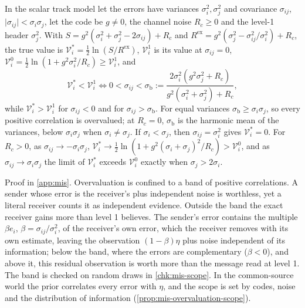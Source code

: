 \begin{proposition}\label{prop:mis-track-band}
In the scalar track model let the errors have variances $\sigma_i^2,\sigma_j^2$ and covariance $\sigma_{ij}$, $\lvert\sigma_{ij}\rvert<\sigma_i\sigma_j$, let the code be $g\neq0$, the channel noise $R_c\ge0$ and the level-1 header $\sigma_j^2$. With $S=g^2(\sigma_i^2+\sigma_j^2-2\sigma_{ij})+R_c$ and $R^{\mathrm{ex}}=g^2(\sigma_j^2-\sigma_{ij}^2/\sigma_i^2)+R_c$, the true value is $\mathcal V^\ast_i=\tfrac12\ln(S/R^{\mathrm{ex}})$, $\mathcal V^1_i$ is its value at $\sigma_{ij}=0$, $\mathcal V^0_i=\tfrac12\ln(1+g^2\sigma_i^2/R_c)\ge\mathcal V^1_i$, and
\begin{equation}\label{eq:mis-band}
\mathcal V^\ast_i<\mathcal V^1_i\iff0<\sigma_{ij}<\sigma_{\mathrm b}:=\frac{2\sigma_i^2(g^2\sigma_j^2+R_c)}{g^2(\sigma_i^2+\sigma_j^2)+R_c},
\end{equation}
while $\mathcal V^\ast_i>\mathcal V^1_i$ for $\sigma_{ij}<0$ and for $\sigma_{ij}>\sigma_{\mathrm b}$. For equal variances $\sigma_{\mathrm b}\ge\sigma_i\sigma_j$, so every positive correlation is overvalued; at $R_c=0$, $\sigma_{\mathrm b}$ is the harmonic mean of the variances, below $\sigma_i\sigma_j$ when $\sigma_i\neq\sigma_j$. If $\sigma_i<\sigma_j$, then $\sigma_{ij}=\sigma_i^2$ gives $\mathcal V^\ast_i=0$. For $R_c>0$, as $\sigma_{ij}\to-\sigma_i\sigma_j$, $\mathcal V^\ast_i\to\tfrac12\ln(1+g^2(\sigma_i+\sigma_j)^2/R_c)>\mathcal V^0_i$, and as $\sigma_{ij}\to\sigma_i\sigma_j$ the limit of $\mathcal V^\ast_i$ exceeds $\mathcal V^0_i$ exactly when $\sigma_j>2\sigma_i$.
\end{proposition}

Proof in \cref{app:mis}. Overvaluation is confined to a band of positive correlations. A sender whose error is the receiver's plus independent noise is worthless, yet a literal receiver counts it as independent evidence. Outside the band the exact receiver gains more than level 1 believes. The sender's error contains the multiple $\beta e_i$, $\beta=\sigma_{ij}/\sigma_i^2$, of the receiver's own error, which the receiver removes with its own estimate, leaving the observation $(1-\beta)\eta$ plus noise independent of its information; below the band, where the errors are complementary ($\beta<0$), and above it, this residual observation is worth more than the message read at level 1. The band is checked on random draws in \cref{chk:mis-scope}. In the common-source world the prior correlates every error with $\eta$, and the scope is set by codes, noise and the distribution of information (\cref{prop:mis-overvaluation-scope}).

